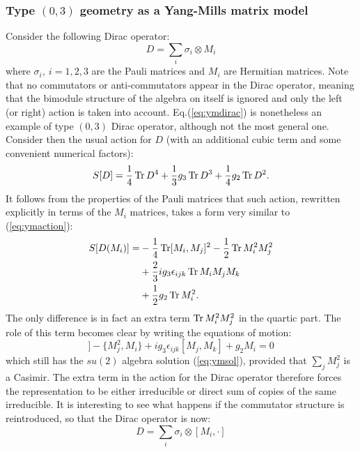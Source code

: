 \subsubsection{Type $(0,3)$ geometry as a Yang-Mills matrix model}
Consider the following Dirac operator:
\begin{equation}\label{eq:ymdirac}
D = \sum_i \sigma_i \otimes M_i
\end{equation}
where $\sigma_i, \ i=1,2,3$ are the Pauli matrices and $M_i$ are Hermitian matrices. Note that no commutators or anti-commutators appear in the Dirac operator, meaning that the bimodule structure of the algebra on itself is ignored and only the left (or right) action is taken into account. Eq.(\ref{eq:ymdirac}) is nonetheless an example of type $(0,3)$ Dirac operator, although not the most general one.\newline
Consider then the usual action for $D$ (with an additional cubic term and some convenient numerical factors):
\begin{equation}
S[D] = \frac{1}{4} \operatorname{Tr} D^4 + \frac{1}{3}g_3 \operatorname{Tr} D^3 + \frac{1}{4}g_2 \operatorname{Tr} D^2.
\end{equation}
It follows from the properties of the Pauli matrices that such action, rewritten explicitly in terms of the $M_i$ matrices, takes a form very similar to (\ref{eq:ymaction}):
\begin{align}
S[D(M_i)] = &-\frac{1}{4} \operatorname{Tr} [M_i, M_j]^2 -\frac{1}{2} \operatorname{Tr} M_i^2 M_j^2 \\ \notag
&+ \frac{2}{3} i g_3 \epsilon_{ijk} \operatorname{Tr} M_i M_j M_k \\ \notag
&+ \frac{1}{2} g_2 \operatorname{Tr} M_i^2.
\end{align}
The only difference is in fact an extra term $\operatorname{Tr} M_i^2 M_j^2$ in the quartic part. The role of this term becomes clear by writing the equations of motion:
\begin{equation}
[M_j, [M_j, M_i]] - \{M_j^2, M_i \} + i g_3 \epsilon_{ijk}[M_j, M_k] + g_2 M_i = 0
\end{equation}
which still has the $su(2)$ algebra solution (\ref{eq:ymsol}), provided that $\sum_j M_j^2$ is a Casimir. The extra term in the action for the Dirac operator therefore forces the representation to be either irreducible or direct sum of copies of the same irreducible.\newline
It is interesting to see what happens if the commutator structure is reintroduced, so that the Dirac operator is now:
\begin{equation}
D = \sum_i \sigma_i \otimes [M_i,\cdot ]
\end{equation}
